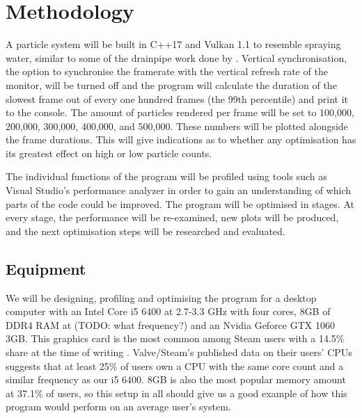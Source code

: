 \documentclass[11pt, a4paper, twocolumn]{article}
\begin{document}
\section{Methodology}

A particle system will be built in C++17 and Vulkan 1.1 to resemble spraying water, similar to some of the drainpipe work done by \citet{Tatarchuk2006}. Vertical synchronisation, the option to synchronise the framerate with the vertical refresh rate of the monitor, will be turned off and the program will calculate the duration of the slowest frame out of every one hundred frames (the 99th percentile) and print it to the console. The amount of particles rendered per frame will be set to 100,000, 200,000, 300,000, 400,000, and 500,000. These numbers will be plotted alongside the frame durations. This will give indications as to whether any optimisation has its greatest effect on high or low particle counts.

The individual functions of the program will be profiled using tools such as Visual Studio's performance analyzer \citep{VSPerfTools} in order to gain an understanding of which parts of the code could be improved. The program will be optimised in stages. At every stage, the performance will be re-examined, new plots will be produced, and the next optimisation steps will be researched and evaluated.

\subsection{Equipment}

We will be designing, profiling and optimising the program for a desktop computer with an Intel Core i5 6400 at 2.7-3.3 GHz with four cores, 8GB of DDR4 RAM at (TODO: what frequency?) and an Nvidia Geforce GTX 1060 3GB. This  graphics card is the most common among Steam users with a 14.5\% share at the time of writing \citep{SteamSurvey}. Valve/Steam's published data on their users' CPUs suggests that at least 25\% of users own a CPU with the same core count and a similar frequency as our i5 6400. 8GB is also the most popular memory amount at 37.1\% of users, so this setup in all should give us a good example of how this program would perform on an average user's system.


\end{document}
